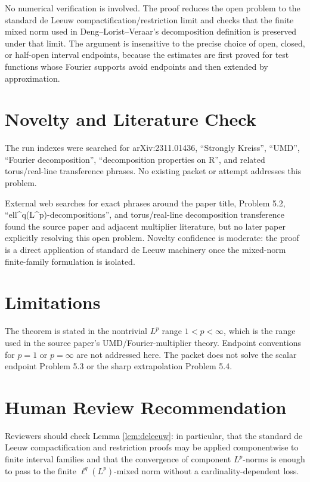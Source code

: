 \documentclass[11pt]{article}
\begin{document}
No numerical verification is involved.  The proof reduces the open problem to
the standard de Leeuw compactification/restriction limit and checks that the
finite mixed norm used in Deng--Lorist--Veraar's decomposition definition is
preserved under that limit.  The argument is insensitive to the precise
choice of open, closed, or half-open interval endpoints, because the estimates
are first proved for test functions whose Fourier supports avoid endpoints
and then extended by approximation.

\section*{Novelty and Literature Check}

The run indexes were searched for arXiv:2311.01436, ``Strongly Kreiss'',
``UMD'', ``Fourier decomposition'', ``decomposition properties on R'', and
related torus/real-line transference phrases.  No existing packet or attempt
addresses this problem.

External web searches for exact phrases around the paper title, Problem 5.2,
``ell\^{}q(L\^{}p)-decompositions'', and torus/real-line decomposition
transference found the source paper and adjacent multiplier literature, but
no later paper explicitly resolving this open problem.
Novelty confidence is moderate: the proof is a direct application of standard
de Leeuw machinery once the mixed-norm finite-family formulation is isolated.

\section*{Limitations}

The theorem is stated in the nontrivial \(L^p\) range \(1<p<\infty\), which is
the range used in the source paper's UMD/Fourier-multiplier theory.  Endpoint
conventions for \(p=1\) or \(p=\infty\) are not addressed here.  The packet
does not solve the scalar endpoint Problem 5.3 or the sharp extrapolation
Problem 5.4.

\section*{Human Review Recommendation}

Reviewers should check Lemma \ref{lem:deleeuw}: in particular, that the
standard de Leeuw compactification and restriction proofs may be applied
componentwise to finite interval families and that the convergence of
component \(L^p\)-norms is enough to pass to the finite
\(\ell^q(L^p)\)-mixed norm without a cardinality-dependent loss.
\end{document}
